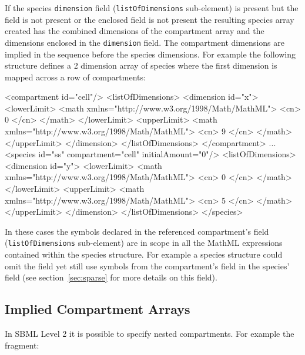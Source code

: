 \documentclass{cekarticle}
\begin{document}
If the species \texttt{dimension} field (\texttt{listOfDimensions} sub-element) is present but
the  field is not present or the enclosed  field is not present
the resulting species array created has the combined dimensions
of the compartment array and the dimensions enclosed in the \texttt{dimension} field.
The compartment dimensions are implied in the sequence before the species dimensions.
For example the following structure defines a 2
dimension array of species where the first dimension is mapped across a row of compartments:
\begin{example}
<compartment id="cell"/>
    <listOfDimensions>
        <dimension id="x">
            <lowerLimit>
                <math xmlns="http://www.w3.org/1998/Math/MathML">
                    <cn> 0 </cn>
                </math>
            </lowerLimit>
            <upperLimit>
                <math xmlns="http://www.w3.org/1998/Math/MathML">
                    <cn> 9 </cn>
                </math>
            </upperLimit>
        </dimension>
    </listOfDimensions>
</compartment>
...
<species id="ss" compartment="cell" initialAmount="0"/>
    <listOfDimensions>
        <dimension id="y">
            <lowerLimit>
                <math xmlns="http://www.w3.org/1998/Math/MathML">
                    <cn> 0 </cn>
                </math>
            </lowerLimit>
            <upperLimit>
                <math xmlns="http://www.w3.org/1998/Math/MathML">
                    <cn> 5 </cn>
                </math>
            </upperLimit>
        </dimension>
    </listOfDimensions>
</species>
\end{example}

In these cases the symbols declared in the referenced compartment's  field (\texttt{listOfDimensions} sub-element)
are in scope in all the MathML expressions contained within the species structure.  For example a species structure
could omit the  field yet still use symbols from the compartment's  field
in the species'  field (see section~\ref{sec:sparse} for more details on this field).

\subsection{Implied Compartment Arrays}

In SBML Level 2 it is possible to specify nested compartments.
For example the fragment:
\end{document}
